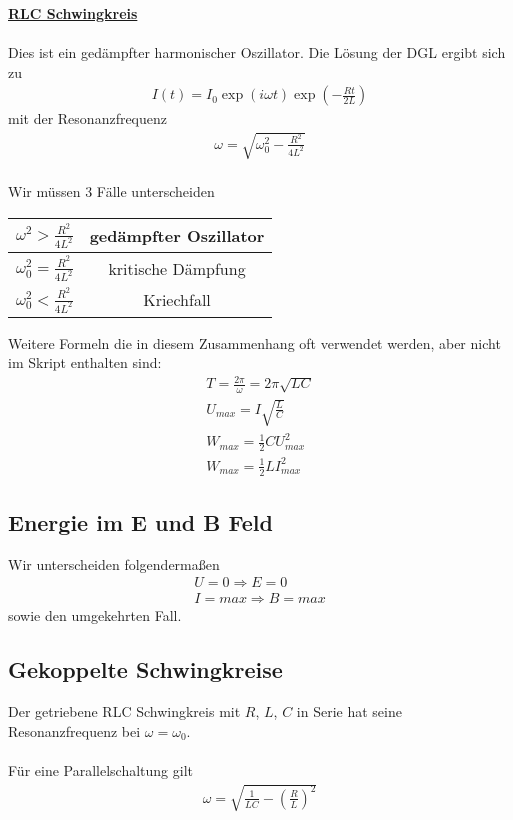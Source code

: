 \documentclass[a4paper,12pt]{report}
\begin{document}
\underline{\textbf{RLC Schwingkreis}} \\\\
Dies ist ein gedämpfter harmonischer Oszillator. Die Lösung der DGL ergibt sich zu 
\begin{align}
I(t) = I_0\exp(i\omega t)\exp(- \frac{Rt}{2L})
\end{align}
mit der Resonanzfrequenz 
\begin{align}
\omega = \sqrt{\omega_0^2 - \frac{R^2}{4L^2}}
\end{align} \\
Wir müssen 3 Fälle unterscheiden  \\
\begin{center}
\begin{tabular}{c|c}
$\omega^2 > \frac{R^2}{4L^2}$ & gedämpfter Oszillator \\
\hline
$\omega_0^2 = \frac{R^2}{4L^2}$ & kritische Dämpfung \\
\hline
$\omega_0^2 < \frac{R^2}{4L^2}$ & Kriechfall 
\end{tabular}
\end{center}
Weitere Formeln die in diesem Zusammenhang oft verwendet werden, aber nicht im Skript enthalten sind: 
\begin{align}
T = \frac{2\pi}{\omega} = 2\pi \sqrt{LC} \\
U_{max} = I \sqrt{\frac{L}{C}} \\
W_{max} = \frac{1}{2} CU_{max}^2 \\
W_{max} = \frac{1}{2} LI_{max}^2
\end{align}

\subsection{Energie im E und B Feld}
Wir unterscheiden folgendermaßen 
\begin{align}
U = 0 \Rightarrow E = 0 \\
I = max \Rightarrow B = max
\end{align}
sowie den umgekehrten Fall. 

\subsection{Gekoppelte Schwingkreise}
Der getriebene RLC Schwingkreis mit $R$, $L$, $C$ in Serie hat seine Resonanzfrequenz bei $ \omega = \omega_0$. \\ \\
Für eine Parallelschaltung gilt 
\begin{align}
\omega = \sqrt{\frac{1}{LC} - (\frac{R}{L})^2}
\end{align}
\end{document}
